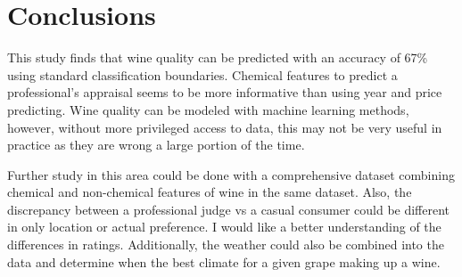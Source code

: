 \documentclass[16pt,twocolumn,letterpaper,titlepage]{article}
\begin{document}

\section{Conclusions}

This study finds that wine quality can be predicted with an accuracy of 67\% using standard classification boundaries. Chemical features to predict a professional's appraisal seems to be more informative than using year and price predicting.  Wine quality can be modeled with machine learning methods, however, without more privileged access to data, this may not be very useful in practice as they are wrong a large portion of the time. 

Further study in this area could be done with a comprehensive dataset combining chemical and non-chemical features of wine in the same dataset. Also, the discrepancy between a professional judge vs a casual consumer could be different in only location or actual preference. I would like a better understanding of the differences in ratings.  Additionally, the weather could also be combined into the data and determine when the best climate for a given grape making up a wine.


\clearpage
\onecolumn


\end{document}
